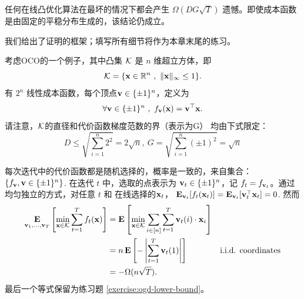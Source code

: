 \begin{theorem} \label{thm:lowerbound}
任何在线凸优化算法在最坏的情况下都会产生 $\Omega(DG \sqrt{T})$ 遗憾。即使成本函数是由固定的平稳分布生成的，该结论仍成立。
\end{theorem}

我们给出了证明的框架；填写所有细节将作为本章末尾的练习。

考虑OCO的一个例子，其中凸集 $\mathcal K$ 是 $n$ 维超立方体，即
$$ \mathcal K = \{ \mathbf{x} \in {\mathbb R}^n \ , \  \|\mathbf{x}\|_\infty \leq 1 \}.$$
有 $2^n$ 线性成本函数，每个顶点$\mathbf{v} \in \{\pm 1\}^n$，定义为
$$ \forall \mathbf{v} \in \{ \pm 1 \}^n \ , \ f_{\mathbf{v}}(\mathbf{x})  = \mathbf{v}^\top \mathbf{x}. $$
请注意，$\mathcal K$的直径和代价函数梯度范数的界（表示为G） 均由下式限定：
$$  D \leq \sqrt{ \sum_{i=1}^n 2^2 } = 2 \sqrt{n} , \ G = \sqrt{ \sum_{i=1}^n (\pm1)^2 } = \sqrt{n}  $$

每次迭代中的代价函数都是随机选择的，概率是一致的，来自集合：
$\{ f_{\mathbf{v}} , \mathbf{v} \in \{\pm 1\}^n \}$. 
在迭代 $t$ 中，选取的点表示为 $\mathbf{v}_t \in \{\pm 1\}^n $，记 $f_t = f_{\mathbf{v}_t}$。通过均匀独立的方式，对任意 $t$ 和 在线选择的$\mathbf{x}_t$，
$\mathop{\mbox{\bf E}}_{\mathbf{v}_t}[f_{t}(\mathbf{x}_t)]= \mathop{\mbox{\bf E}}_{\mathbf{v}_t}[ \mathbf{v}_t^\top
\mathbf{x}_t] = 0$. 
然而
\begin{align*}
\mathop{\mbox{\bf E}}_{\mathbf{v}_1,\ldots,\mathbf{v}_T}\left[\min_{\mathbf{x} \in \mathcal K} \sum_{t=1}^T f_t(\mathbf{x})\right] & =
\mathop{\mbox{\bf E}} \left[\min_{\mathbf{x} \in \mathcal K} \sum_{i \in [n]} \sum_{t=1}^T \mathbf{v}_t(i) \cdot \mathbf{x}_i \right] \\
& = n \mathop{\mbox{\bf E}}\left[-\left|\sum_{t=1}^T \mathbf{v}_t(1) \right|\right] & \mbox{i.i.d. coordinates}\\
& = -\Omega(n \sqrt{T}).
\end{align*}
最后一个等式保留为练习题 \ref{exercise:ogd-lower-bound}。

